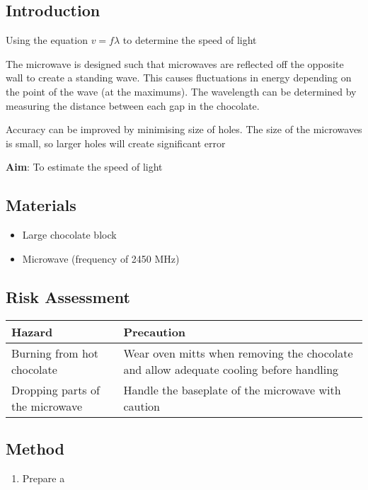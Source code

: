 	\subsection{Introduction}
	
		Using the equation $v = f \lambda$ to determine the speed of light

		The microwave is designed such that microwaves are reflected off the opposite wall to create a standing wave. This causes fluctuations in energy depending on the point of the wave (at the maximums). The wavelength can be determined by measuring the distance between each gap in the chocolate.

		Accuracy can be improved by minimising size of holes. The size of the microwaves is small, so larger holes will create significant error

	\textbf{Aim}: To estimate the speed of light

	\subsection{Materials}
	
		\begin{itemize}
			\item Large chocolate block
			\item Microwave (frequency of 2450 MHz)
		\end{itemize}

	\subsection{Risk Assessment}
		\begin{table}[H]
			\centering
			\begin{tabular}{p{7cm}|p{7cm}}
				Hazard & Precaution \\ \hline
				Burning from hot chocolate & Wear oven mitts when removing the chocolate and allow adequate cooling before handling \\
				Dropping parts of the microwave & Handle the baseplate of the microwave with caution
			\end{tabular}
		\end{table}

	\subsection{Method}
	
		\begin{enumerate}
			\item Prepare a 
		\end{enumerate}

